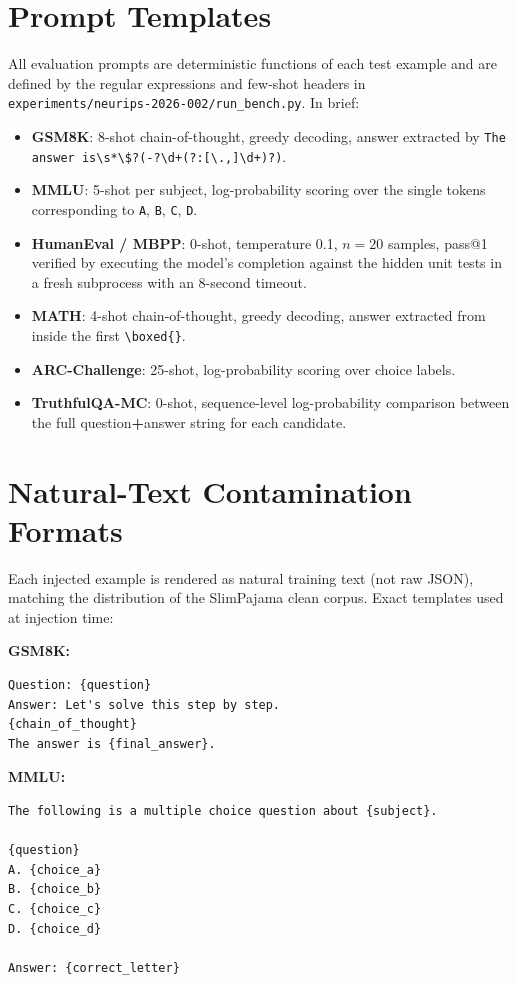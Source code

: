 \documentclass{article}
\begin{document}
\section{Prompt Templates}
\label{app:prompts}
All evaluation prompts are deterministic functions of each test example and are
defined by the regular expressions and few-shot headers in
\texttt{experiments/neurips-2026-002/run\_bench.py}. In brief:
\begin{itemize}[leftmargin=*,nosep]
  \item \textbf{GSM8K}: 8-shot chain-of-thought, greedy decoding, answer extracted by \texttt{The answer is\textbackslash s*\textbackslash \$?(-?\textbackslash d+(?:[\textbackslash .,]\textbackslash d+)?)}.
  \item \textbf{MMLU}: 5-shot per subject, log-probability scoring over the single tokens corresponding to \texttt{A}, \texttt{B}, \texttt{C}, \texttt{D}.
  \item \textbf{HumanEval / MBPP}: 0-shot, temperature 0.1, $n=20$ samples, pass@1 verified by executing the model's completion against the hidden unit tests in a fresh subprocess with an 8-second timeout.
  \item \textbf{MATH}: 4-shot chain-of-thought, greedy decoding, answer extracted from inside the first \verb|\boxed{}|.
  \item \textbf{ARC-Challenge}: 25-shot, log-probability scoring over choice labels.
  \item \textbf{TruthfulQA-MC}: 0-shot, sequence-level log-probability comparison between the full question\textbf{+}answer string for each candidate.
\end{itemize}

\section{Natural-Text Contamination Formats}
\label{app:formats}
Each injected example is rendered as natural training text (not raw JSON), matching the distribution of the SlimPajama clean corpus. Exact templates used at injection time:

\noindent\textbf{GSM8K:}
\begin{verbatim}
Question: {question}
Answer: Let's solve this step by step.
{chain_of_thought}
The answer is {final_answer}.
\end{verbatim}

\noindent\textbf{MMLU:}
\begin{verbatim}
The following is a multiple choice question about {subject}.

{question}
A. {choice_a}
B. {choice_b}
C. {choice_c}
D. {choice_d}

Answer: {correct_letter}
\end{verbatim}
\end{document}
